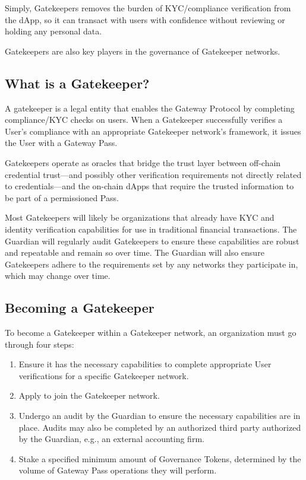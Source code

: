 Simply, Gatekeepers removes the burden of KYC/compliance verification from the dApp, so it can transact with users with confidence without reviewing or holding any personal data.

Gatekeepers are also key players in the governance of Gatekeeper networks.

\subsection{What is a Gatekeeper?}
A gatekeeper is a legal entity that enables the Gateway Protocol by completing compliance/KYC checks on users. When a Gatekeeper successfully verifies a User’s compliance with an appropriate Gatekeeper network’s framework, it issues the User with a Gateway Pass.

Gatekeepers operate as oracles that bridge the trust layer between off-chain credential trust—and possibly other verification requirements not directly related to credentials—and the on-chain dApps that require the trusted information to be part of a permissioned Pass.

Most Gatekeepers will likely be organizations that already have KYC and identity verification capabilities for use in traditional financial transactions. The Guardian will regularly audit Gatekeepers to ensure these capabilities are robust and repeatable and remain so over time.
The Guardian will also ensure Gatekeepers adhere to the requirements set by any networks they participate in, which may change over time.

\subsection{Becoming a Gatekeeper}

To become a Gatekeeper within a Gatekeeper network, an organization must go through four steps:

\begin{enumerate}
\item Ensure it has the necessary capabilities to complete appropriate User verifications for a specific Gatekeeper network.
\item Apply to join the Gatekeeper network.
\item Undergo an audit by the Guardian to ensure the necessary capabilities are in place. Audits may also be completed by an authorized third party authorized by the Guardian, e.g., an external accounting firm.
\item Stake a specified minimum amount of Governance Tokens, determined by the volume of Gateway Pass operations they will perform.
\end{enumerate}

